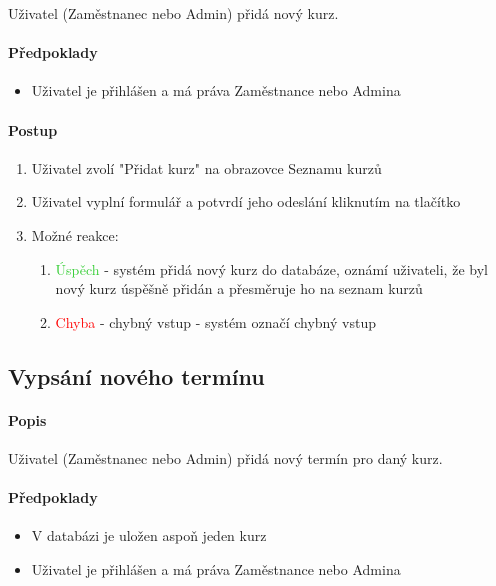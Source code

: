 \documentclass[12pt,a4paper,titlepage,final]{report}
\begin{document}
Uživatel (Zaměstnanec nebo Admin) přidá nový kurz.

\paragraph{Předpoklady}

\begin{itemize}
	\item Uživatel je přihlášen a má práva Zaměstnance nebo Admina
\end{itemize}

\paragraph{Postup}

\begin{enumerate}
	\item Uživatel zvolí "Přidat kurz" na obrazovce Seznamu kurzů
	\item Uživatel vyplní formulář a potvrdí jeho odeslání kliknutím na tlačítko
	\item Možné reakce:
	\begin{enumerate}
		\item \textcolor{LimeGreen}{Úspěch} - systém přidá nový kurz do databáze, oznámí uživateli, že byl nový kurz úspěšně přidán a přesměruje ho na seznam kurzů
		\item \textcolor{Red}{Chyba} - chybný vstup - systém označí chybný vstup
	\end{enumerate}	
\end{enumerate}



\subsection{Vypsání nového termínu}

\paragraph{Popis}

Uživatel (Zaměstnanec nebo Admin) přidá nový termín pro daný kurz.

\paragraph{Předpoklady}

\begin{itemize}
	\item V databázi je uložen aspoň jeden kurz
	\item Uživatel je přihlášen a má práva Zaměstnance nebo Admina
\end{itemize}
\end{document}
